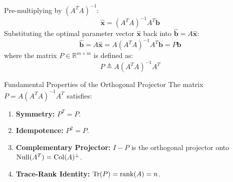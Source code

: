 Pre-multiplying by $(A^T A)^{-1}$:
\begin{equation}
\hat{\mathbf{x}} = (A^T A)^{-1} A^T \mathbf{b}
\end{equation}
Substituting the optimal parameter vector $\hat{\mathbf{x}}$ back into $\hat{\mathbf{b}} = A\hat{\mathbf{x}}$:
\begin{equation}
\hat{\mathbf{b}} = A\hat{\mathbf{x}} = A (A^T A)^{-1} A^T \mathbf{b} = P \mathbf{b}
\end{equation}
where the matrix $P \in \mathbb{R}^{m \times m}$ is defined as:
\begin{equation}
P \triangleq A(A^T A)^{-1}A^T
\label{eq:proj_matrix_formula}
\end{equation}

\begin{theorembox}{Fundamental Properties of the Orthogonal Projector}
The matrix $P = A(A^T A)^{-1}A^T$ satisfies:
\begin{enumerate}
    \item \textbf{Symmetry:} $P^T = P$.
    \item \textbf{Idempotence:} $P^2 = P$.
    \item \textbf{Complementary Projector:} $I - P$ is the orthogonal projector onto $\operatorname{Null}(A^T) = \operatorname{Col}(A)^\perp$.
    \item \textbf{Trace-Rank Identity:} $\operatorname{Tr}(P) = \operatorname{rank}(A) = n$.
\end{enumerate}
\end{theorembox}

